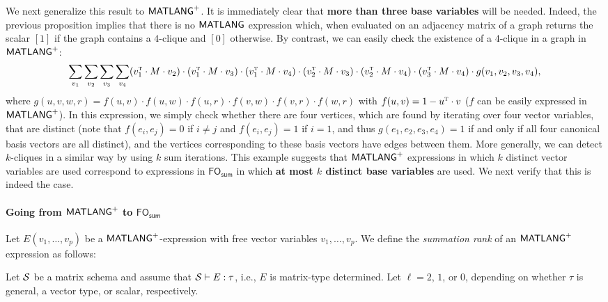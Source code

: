 We next generalize this result to $\mathsf{MATLANG}^{\sf +}$. It is immediately clear that {\bf more than three base variables} will be needed.
Indeed, the previous proposition implies that  there is no $\mathsf{MATLANG}$ expression which, when evaluated
on an adjacency matrix of a graph returns the scalar $[1]$ if the graph contains a $4$-clique and $[0]$ otherwise. By contrast, we can easily check the existence of a $4$-clique in a graph in
$\mathsf{MATLANG}^{\sf +}$:
$$\sum_{v_1}\sum_{v_2}\sum_{v_3}\sum_{v_4} (v_1^{\textsc{t}}\cdot M \cdot v_2)\cdot (v_1^{\textsc{t}}\cdot M\cdot v_3)\cdot (v_1^{\textsc{t}}\cdot M \cdot v_4)\cdot (v_2^{\textsc{t}}\cdot M\cdot v_3)\cdot (v_2^{\textsc{t}}\cdot M\cdot v_4)\cdot (v_3^{\textsc{t}}\cdot M\cdot v_4)\cdot g(v_1,v_2,v_3,v_4),$$
where $g(u,v,w,r)=f(u,v)\cdot f(u,w)\cdot f(u,r)\cdot f(v,w)\cdot f(v,r)\cdot f(w,r)$ with $f(u,v)=1-u^{\textsc{t}}\cdot v$ ($f$ can be easily expressed in $\mathsf{MATLANG}^{\sf +}$).
In this expression, we simply check whether there are four vertices, which are found by iterating over four vector variables, that are distinct (note that $f(e_i,e_j)=0$ if $i\neq j$ and $f(e_i,e_j)=1$ if $i=1$, and
thus $g(e_1,e_2,e_3,e_4)=1$ if and only if all four canonical basis vectors are all distinct), and the vertices corresponding to these basis vectors have edges between them.
More generally, we can  detect $k$-cliques in a similar way by using $k$ sum iterations. This example suggests that $\mathsf{MATLANG}^{\sf +}$ expressions in which $k$ distinct vector variables are used correspond to expressions in $\textsf{FO}_{\textsf{sum}}$ in which {\bf at most $k$ distinct base variables} are used. We next verify that this is indeed the case.


%

\paragraph{Going from $\mathsf{MATLANG}^{\sf +}$ to $\textsf{FO}_{\textsf{sum}}$}
Let $E(v_1,\ldots,v_p)$ be a $\mathsf{MATLANG}^{\sf +}$-expression with free vector variables $v_1,\ldots,v_p$. We define the \textit{summation rank} of an $\mathsf{MATLANG}^{\sf +}$ expression as follows:
\newcommand{\sr}{}

Let $\mathcal{S}$ be a matrix schema and assume that  $\mathcal{S}\vdash E:\tau$, i.e., $E$ is matrix-type determined.
Let $\ell=2$, $1$,
or $0$, depending on whether $\tau$ is general, a vector type, or
scalar, respectively.

